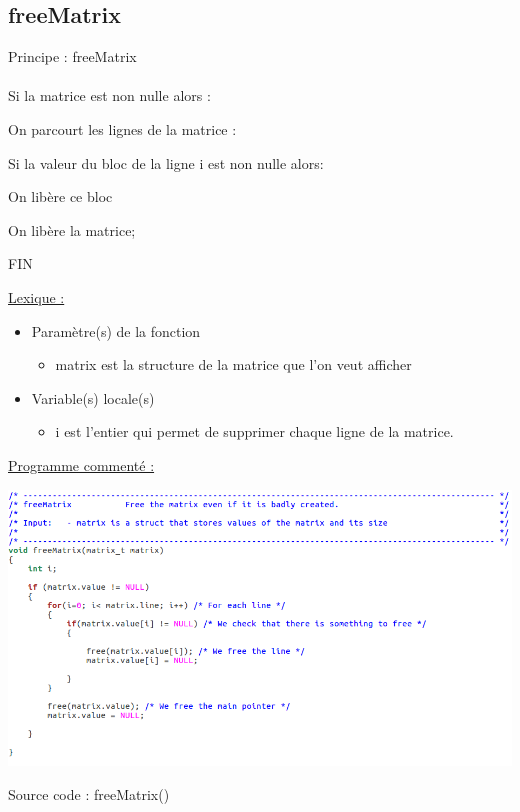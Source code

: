 \documentclass[a4paper]{article}
\newcommand\tab[1][1cm]{\hspace*{#1}}
\begin{document}
\subsection{freeMatrix}
\begin{algorithm}
Principe : freeMatrix
\\
\\
\tab Si la matrice est non nulle alors : 

\tab \tab On parcourt les lignes de la matrice : 

\tab \tab \tab Si la valeur du bloc de la ligne i est non nulle alors: 

\tab \tab \tab \tab On libère ce bloc

\tab \tab On libère la matrice; 

FIN
\end{algorithm}

\underline{Lexique :}
\begin{itemize}
\item Paramètre(s) de la fonction  
\begin{itemize}
\item matrix est la structure de la matrice que l'on veut afficher
\end{itemize}
\item Variable(s) locale(s)
\begin{itemize}
\item i est l'entier qui permet de supprimer chaque ligne de la matrice.
\end{itemize}
\end{itemize}

\underline{Programme commenté :}
\begin{center}
\includegraphics[scale=0.39]{freeMatrix.png}

Source code : freeMatrix()
\end{center}
\end{document}
